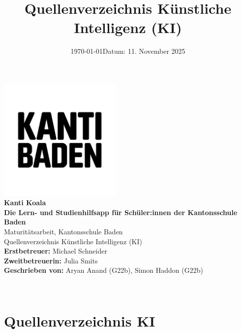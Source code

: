 \documentclass[12pt, a4paper]{article}
\title{Quellenverzeichnis Künstliche Intelligenz (KI)}
\author{}
\date{\today}
\begin{document}
\makeatletter
\begin{titlepage}
    \centering
    \vspace*{1cm}
       { \includegraphics[width=6cm]{img/kanti-baden.png}}\\[1cm]

    {\LARGE \textbf{Kanti Koala}}\\
    {\textbf{Die Lern- und Studienhilfsapp für Schüler:innen der Kantonsschule Baden}}\\[1cm]

    {Maturitätsarbeit, Kantonsschule Baden}\\
    {Quellenverzeichnis Künstliche Intelligenz (KI)}\\[1cm]
    
    \textbf{Erstbetreuer: }{Michael Schneider}\\
    \textbf{Zweitbetreuerin: }{Julia Smits}\\[1cm]
    
    \textbf{Geschrieben von: }{Aryan Anand (G22b), Simon Haddon (G22b)}\\[1cm]
    \date{\large Datum: 11. November 2025}
    {\@date\\}
\end{titlepage}
\makeatother


\section*{Quellenverzeichnis KI}
\end{document}
